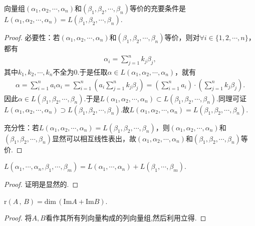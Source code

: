 \documentclass[../../main.tex]{subfiles}%
\begin{document}
\begin{proposition}\label{proposition:等价向量组张成的子空间相同}
向量组$(\alpha_1,\alpha_2,\cdots,\alpha_n)$和$(\beta_1,\beta_2,\cdots,\beta_n)$等价的充要条件是$L(\alpha_1,\alpha_2,\cdots,\alpha_n) = L(\beta_1,\beta_2,\cdots,\beta_n)$.
\end{proposition}
\begin{proof}

必要性：若$(\alpha _1,\alpha _2,\cdots ,\alpha _n)$和$(\beta _1,\beta _2,\cdots ,\beta _n)$等价，则对$\forall i\in \{ 1,2,\cdots ,n \}$，都有
\begin{align*}
\alpha _i=\sum_{j=1}^n{k_j\beta _j},
\end{align*}
其中$k_1,k_2,\cdots ,k_n$不全为$0$.于是任取$\alpha \in L(\alpha _1,\alpha _2,\cdots ,\alpha _n)$，就有
\begin{align*}
\alpha =\sum_{i=1}^n{a_i\alpha _i}=\sum_{i=1}^n{\left( a_i\sum_{j=1}^n{k_j\beta _j} \right)}=\left( \sum_{i=1}^n{a_i} \right) \cdot \left( \sum_{j=1}^n{k_j\beta _j} \right) .
\end{align*}
因此$\alpha \in L(\beta _1,\beta _2,\cdots ,\beta _n)$.于是$L(\alpha _1,\alpha _2,\cdots ,\alpha _n) \subset L(\beta _1,\beta _2,\cdots ,\beta _n)$.同理可证$L(\alpha _1,\alpha _2,\cdots ,\alpha _n) \supset L(\beta _1,\beta _2,\cdots ,\beta _n)$.故$L(\alpha _1,\alpha _2,\cdots ,\alpha _n) =L(\beta _1,\beta _2,\cdots ,\beta _n)$.

充分性：若$L(\alpha _1,\alpha _2,\cdots ,\alpha _n) =L(\beta _1,\beta _2,\cdots ,\beta _n)$，则$(\alpha _1,\alpha _2,\cdots ,\alpha _n)$和$(\beta _1,\beta _2,\cdots ,\beta _n)$显然可以相互线性表出，故$(\alpha _1,\alpha _2,\cdots ,\alpha _n)$和$(\beta _1,\beta _2,\cdots ,\beta _n)$等价.

\end{proof}

\begin{proposition}\label{proposition:命题31654668486}
$L\left( \alpha _1,\cdots ,\alpha _n,\beta _1,\cdots ,\beta _m \right) =L\left( \alpha _1,\cdots ,\alpha _n \right) +L\left( \beta _1,\cdots ,\beta _m \right) .$
\end{proposition}
\begin{proof}

证明是显然的.

\end{proof}

\begin{corollary}\label{corollary:推论rA,,B=dimImA+ImB}
$\mathrm{r}\left( A\,,\,B \right) =\mathrm{dim}\,\left( \mathrm{Im}A+\mathrm{Im}B \right) .$
\end{corollary}
\begin{proof}

将$A,B$看作其所有列向量构成的列向量组,然后利用立得.

\end{proof}
\end{document}
